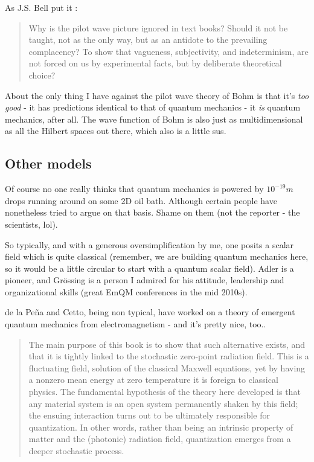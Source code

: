 \documentclass[../rzero]{subfiles}
\begin{document}
As J.S. Bell put it \cite{Bell1982}:
\begin{quotation}
Why is the pilot wave picture ignored in text books? Should it not be taught, not as the only way, but as an antidote to the prevailing complacency? To show that vagueness, subjectivity, and indeterminism, are not forced on us by experimental facts, but by deliberate theoretical choice?
\end{quotation}

About the only thing I have against the pilot wave theory of Bohm is that it's \textit{too good} - it has predictions identical to that of quantum mechanics - it \textit{is} quantum mechanics, after all. The wave function of Bohm is also just as multidimensional as all the Hilbert spaces out there, which also is a little sus. 

\subsection{Other models}
Of course no one really thinks that quantum mechanics is powered by $10^{-19}m$ drops running around on some 2D oil bath. Although certain people have nonetheless tried to argue on that basis. Shame on them (not the reporter - the scientists, lol).\cite{wolchoverFamousExperimentDooms2018}

So typically, and with a generous oversimplification by me, one posits a scalar field which is quite classical (remember, we are building quantum mechanics here, so it would be a little circular to  start with a quantum scalar field). Adler\cite{adlerQuantumTheoryEmergent2004} is a pioneer, and Grössing is a person I admired for his attitude, leadership and organizational skills (great EmQM conferences in the mid 2010s)\cite{Grossing2012}. 

de la Peña and Cetto, being non typical, have worked on a theory of emergent quantum mechanics from electromagnetism - and it's pretty nice, too.\cite{DelaPena2015}.

\begin{quotation}
	The main purpose of this book is to show that such alternative exists, and that it is tightly linked to the stochastic zero-point radiation field. This is a fluctuating field, solution of the classical Maxwell equations, yet by having a nonzero mean energy at zero temperature it is foreign to classical physics. The fundamental hypothesis of the theory here developed is that any material system is an open system permanently shaken by this field; the ensuing interaction turns out to be ultimately responsible for quantization. In other words, rather than being an intrinsic property of matter and the (photonic) radiation field, quantization emerges from a deeper stochastic process.
\end{quotation}
\end{document}
